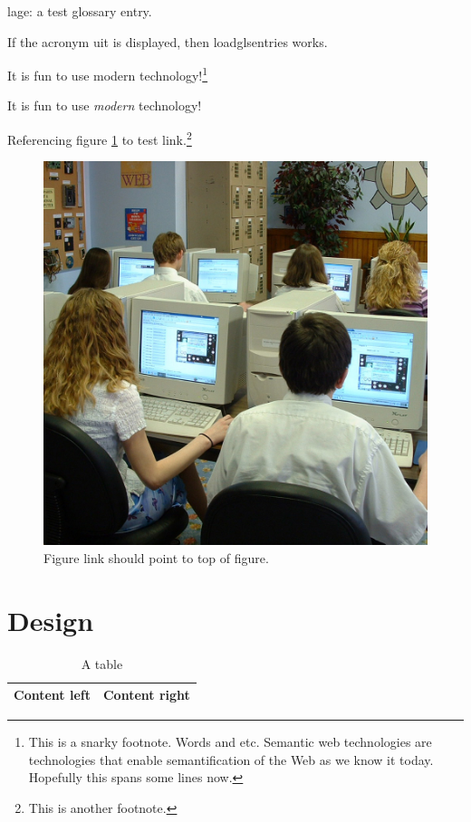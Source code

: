 \documentclass[final,11pt,baselinegrid]{../../uit-thesis}
\begin{document}
\Gls{lage}: a test glossary entry.

If the acronym \ac{uit} is displayed, then loadglsentries works.

It is fun to use modern  technology!\footnote{This is a snarky
footnote. Words and etc. Semantic web technologies are technologies that enable
semantification of the Web as we know it today. Hopefully this spans some lines
now.}

It is fun to use \emph{modern } technology!

Referencing figure \ref{fig:ex} to test link.\footnote{This is another
footnote.}

\begin{figure}\label{fig:ex}
\centering
\includegraphics[scale=0.1]{748443511_095ae916df_o.jpg}
\caption{Figure link should point to top of figure.}
\end{figure}

\chapter{Design}
\lipsum[8-10]

\begin{table}
\centering
\begin{tabular}{|l|l|}
\hline
Content left & Content right\\
\hline
\end{tabular}
\caption{A table}
\end{table}
\end{document}
